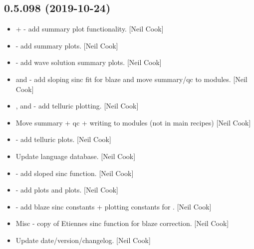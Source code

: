 \documentclass[a4paper,10pt,english]{report}
\begin{document}
\subsection{0.5.098 (2019-10-24)}
\label{\detokenize{misc/changelog:id45}}\begin{itemize}
\item {} 
 +  - add summary
plot functionality. {[}Neil Cook{]}

\item {} 
 - add summary plots. {[}Neil Cook{]}

\item {} 
 - add wave solution
summary plots. {[}Neil Cook{]}

\item {} 
 and  - add sloping sinc fit for blaze and
move summary/qc to modules. {[}Neil Cook{]}

\item {} 
,  and  -
add telluric plotting. {[}Neil Cook{]}

\item {} 
Move summary + qc + writing to modules (not in main recipes) {[}Neil
Cook{]}

\item {} 
 - add telluric plots. {[}Neil Cook{]}

\item {} 
Update language database. {[}Neil Cook{]}

\item {} 
 - add sloped sinc function. {[}Neil Cook{]}

\item {} 
 - add  plots
and  plots. {[}Neil Cook{]}

\item {} 
 - add blaze sinc constants + plotting
constants for . {[}Neil Cook{]}

\item {} 
Misc - copy of Etiennes sinc function for blaze correction. {[}Neil
Cook{]}

\item {} 
Update date/version/changelog. {[}Neil Cook{]}

\end{itemize}
\end{document}
